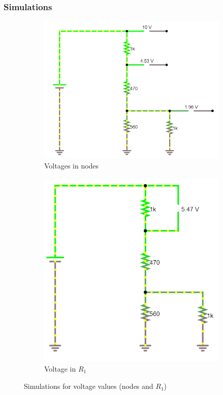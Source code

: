 \documentclass[letterpaper]{article}
\begin{document}
\subsubsection{Simulations}
\begin{figure}[H]
\begin{subfigure}{0.48\textwidth}
\includegraphics[width=\linewidth]{sims/Vnodes}
\caption{Voltages in nodes}
\end{subfigure}
\begin{subfigure}{0.48\textwidth}
\includegraphics[width=\linewidth]{sims/VR1}
\caption{Voltage in $R_1$}
\end{subfigure}
    \caption{Simulations for voltage values (nodes and $R_1$)}
\end{figure}
\end{document}
